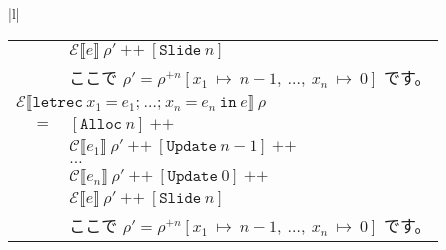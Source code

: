 \documentclass{jarticle}
\begin{document}
\begin{tabular} {|l|}
\begin{tabular}{r c l}
		                                                                         &     & $\mathcal{E} \llbracket e \rrbracket ~ \rho' ~ \texttt{++} ~ \left[\texttt{Slide} ~ n\right]$                                                                                                \\
		                                                                         &     & ここで $\rho' = \rho^{+n} \left[x_1 ~ \mapsto ~ n - 1, ~ \ldots , ~ x_n ~ \mapsto ~ 0\right]$ です。                                                                                         \\
		\multicolumn{3}{l}{$\mathcal{E} \llbracket \texttt{letrec} ~ x_1 ~ \texttt{=} ~ e_1\texttt{;} ~  \ldots \texttt{;} ~ x_n ~ \texttt{=} ~ e_n ~ \texttt{in} ~ e \rrbracket ~ \rho$}                                                                                             \\
		                                                                         & $=$ & $\left[\texttt{Alloc} ~ n\right] ~ \texttt{++}$                                                                                                                                              \\
		                                                                         &     & $\mathcal{C} \llbracket e_1 \rrbracket ~ \rho' ~ \texttt{++} ~ \left[\texttt{Update} ~ n - 1\right] ~ \texttt{++}$                                                                           \\
		                                                                         &     & $\ldots$                                                                                                                                                                                     \\
		                                                                         &     & $\mathcal{C} \llbracket e_n \rrbracket ~ \rho' ~ \texttt{++} ~ \left[\texttt{Update} ~ 0\right] ~ \texttt{++}$                                                                               \\
		                                                                         &     & $\mathcal{E} \llbracket e \rrbracket ~ \rho' ~ \texttt{++} ~ \left[\texttt{Slide} ~ n\right]$                                                                                                \\
		                                                                         &     & ここで $\rho' = \rho^{+n} \left[x_1 ~ \mapsto ~ n - 1, ~ \ldots , ~ x_n ~ \mapsto ~ 0\right]$ です。                                                                                         \\

\end{tabular}
\end{tabular}
\end{document}
